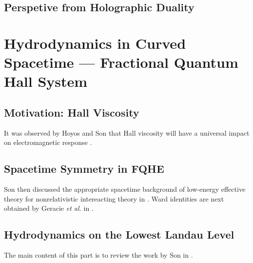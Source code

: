 \documentclass[10pt,nofootinbib,letterpaper]{revtex4}
\begin{document}
	\subsection{Perspetive from Holographic Duality}

\section{Hydrodynamics in Curved Spacetime --- Fractional Quantum Hall System}
	\subsection{Motivation: Hall Viscosity}
		It was observed by Hoyos and Son that Hall viscosity will have a universal impact on electromagnetic response \cite{hoyos2012hall}.
	\subsection{Spacetime Symmetry in FQHE}
		Son then discussed the appropriate spacetime background of low-energy effective theory for nonrelativistic intereacting theory in \cite{son2013newton}. Ward identities are next obtained by Geracie {\it et al.} in \cite{geracie2015spacetime}.

	\subsection{Hydrodynamics on the Lowest Landau Level}
		The main content of this part is to review the work by Son in \cite{geracie2015hydrodynamics}.


\end{document}
